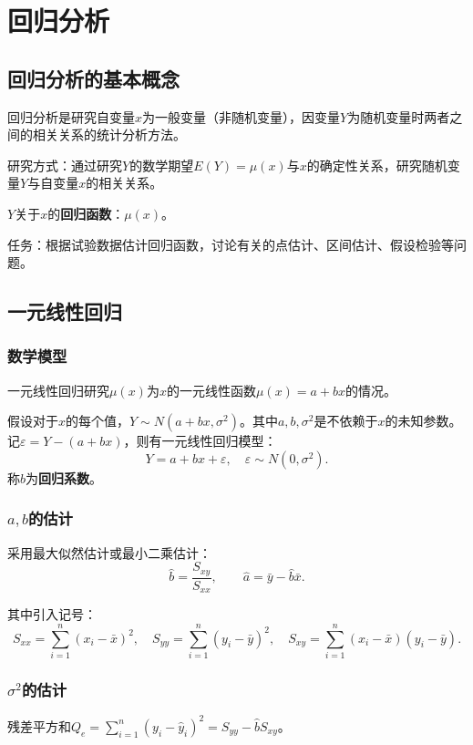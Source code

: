 \documentclass[11pt,a4paper]{report}
\theoremstyle{definition}
\theoremstyle{plain}
\begin{document}
\section{回归分析}

\subsection{回归分析的基本概念}

回归分析是研究自变量$x$为一般变量（非随机变量），因变量$Y$为随机变量时两者之间的相关关系的统计分析方法。

研究方式：通过研究$Y$的数学期望$E(Y)=\mu(x)$与$x$的确定性关系，研究随机变量$Y$与自变量$x$的相关关系。

$Y$关于$x$的\textbf{回归函数}：$\mu(x)$。

任务：根据试验数据估计回归函数，讨论有关的点估计、区间估计、假设检验等问题。

\subsection{一元线性回归}

\subsubsection{数学模型}

一元线性回归研究$\mu(x)$为$x$的一元线性函数$\mu(x)=a+bx$的情况。

假设对于$x$的每个值，$Y\sim N(a+bx,\sigma^2)$。其中$a,b,\sigma^2$是不依赖于$x$的未知参数。记$\varepsilon=Y-(a+bx)$，则有一元线性回归模型：
\[
Y=a+bx+\varepsilon,\quad \varepsilon\sim N(0,\sigma^2).
\]
称$b$为\textbf{回归系数}。

\subsubsection{$a,b$的估计}

采用最大似然估计或最小二乘估计：
\[
\hat{b}=\frac{S_{xy}}{S_{xx}},\qquad \hat{a}=\bar{y}-\hat{b}\bar{x}.
\]

其中引入记号：
\[
S_{xx}=\sum_{i=1}^{n}(x_i-\bar{x})^2,\quad S_{yy}=\sum_{i=1}^{n}(y_i-\bar{y})^2,\quad S_{xy}=\sum_{i=1}^{n}(x_i-\bar{x})(y_i-\bar{y}).
\]

\subsubsection{$\sigma^2$的估计}

残差平方和$Q_e=\sum_{i=1}^{n}(y_i-\hat{y}_i)^2=S_{yy}-\hat{b}S_{xy}$。
\end{document}
